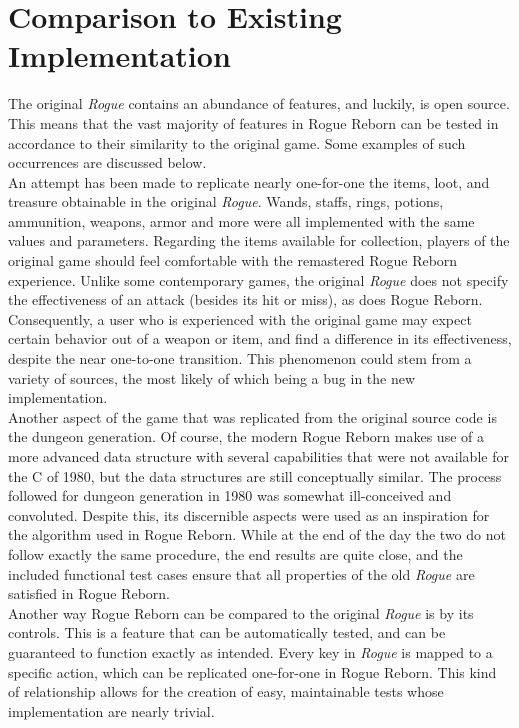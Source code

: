\documentclass[12pt, titlepage]{article}
\begin{document}
\newpage
\section{Comparison to Existing Implementation}	
\label{section5}

	The original \textit{Rogue} contains an abundance of features, and luckily, is open source.  This means that the vast majority of features in Rogue Reborn can be tested in accordance to their similarity to the original game. Some examples of such occurrences are discussed below.\\

	An attempt has been made to replicate nearly one-for-one the items, loot, and treasure obtainable in the original \textit{Rogue}.  Wands, staffs, rings, potions, ammunition, weapons, armor and more were all implemented with the same values and parameters.  Regarding the items available for collection, players of the original game should feel comfortable with the remastered Rogue Reborn experience.  Unlike some contemporary games, the original \textit{Rogue} does not specify the effectiveness of an attack (besides its hit or miss), as does Rogue Reborn.  Consequently, a user who is experienced with the original game may expect certain behavior out of a weapon or item, and find a difference in its effectiveness, despite the near one-to-one transition.  This phenomenon could stem from a variety of sources, the most likely of which being a bug in the new implementation.\\

	Another aspect of the game that was replicated from the original source code is the dungeon generation.  Of course, the modern Rogue Reborn makes use of a more advanced data structure with several capabilities that were not available for the C of 1980, but the data structures are still conceptually similar.  The process followed for dungeon generation in 1980 was somewhat ill-conceived and convoluted.  Despite this, its discernible aspects were used as an inspiration for the algorithm used in Rogue Reborn.  While at the end of the day the two do not follow exactly the same procedure, the end results are quite close, and the included functional test cases ensure that all properties of the old \textit{Rogue} are satisfied in Rogue Reborn.\\

	Another way Rogue Reborn can be compared to the original \textit{Rogue} is by its controls.  This is a feature that can be automatically tested, and can be guaranteed to function exactly as intended.  Every key in \textit{Rogue} is mapped to a specific action, which can be replicated one-for-one in Rogue Reborn.  This kind of relationship allows for the creation of easy, maintainable tests whose implementation are nearly trivial.\\
\end{document}
